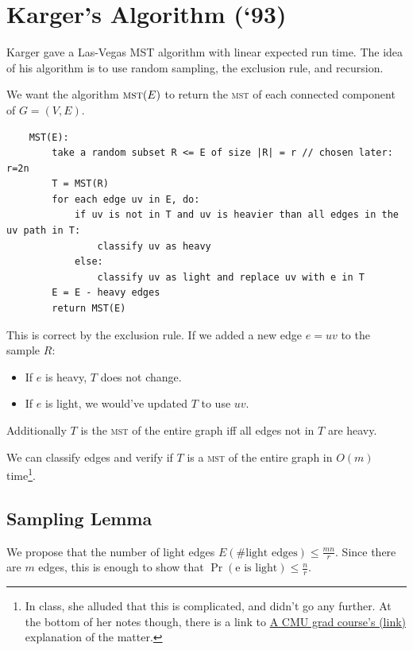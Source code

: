             \section{Karger's Algorithm (`93)} %
            \label{sec:karger_s_algorithm_}
                Karger gave a Las-Vegas MST algorithm with linear expected run time.
                The idea of his algorithm is to use random sampling, the exclusion rule, and recursion.

                We want the algorithm $\textsc{mst}(E)$ to return the \textsc{mst} of each connected component of $G=(V, E)$.

                \begin{verbatim}
    MST(E):
        take a random subset R <= E of size |R| = r // chosen later: r=2n
        T = MST(R)
        for each edge uv in E, do:
            if uv is not in T and uv is heavier than all edges in the uv path in T:
                classify uv as heavy
            else:
                classify uv as light and replace uv with e in T
        E = E - heavy edges
        return MST(E)
                \end{verbatim}
                This is correct by the exclusion rule.
                If we added a new edge $e = uv$ to the sample $R$:
                \begin{itemize}
                    \item If $e$ is heavy, $T$ does not change.
                    \item If $e$ is light, we would've updated $T$ to use $uv$.
                \end{itemize}
                Additionally $T$ is the \textsc{mst} of the entire graph iff all edges not in $T$ are heavy.

                We can classify edges and verify if $T$ is a \textsc{mst} of the entire graph in $O(m)$ time\footnote{In class, she alluded that this is complicated, and didn't go any further. At the bottom of her notes though, there is a link to \href{https://www.cs.cmu.edu/afs/cs.cmu.edu/academic/class/15750-s01/www/notes/lect0208}{A CMU grad course's (link)} explanation of the matter.}.

                \subsection{Sampling Lemma} %
                \label{sub:sampling_lemma}
                    We propose that the number of light edges $E(\text{\# light edges}) \le \frac{mn}{r}$.
                    Since there are $m$ edges, this is enough to show that $\Pr(\text{e is light}) \le\frac{n}{r}$.

